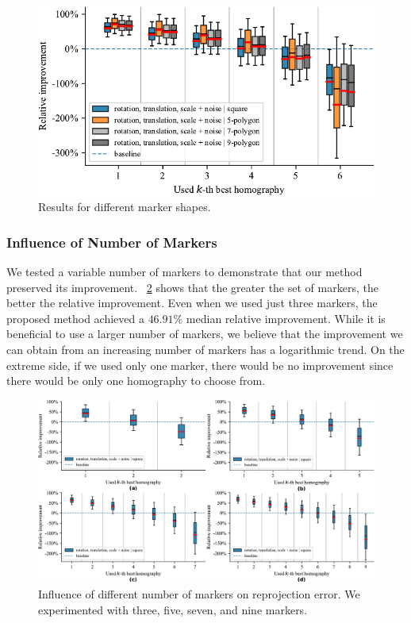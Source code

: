 \begin{figure}[t]
    \centering
    \includegraphics[width=\boxplotimgwidth]{figures/homography/shape_influence.pdf}
    \caption[Influence of marker shape]{Results for different marker shapes.}
    \label{fig:ShapeInfluence}
\end{figure}

\subsubsection{Influence of Number of Markers}

We tested a variable number of markers to demonstrate that our method preserved its improvement. \figtext{}~\ref{fig:NMarkersInfluence} shows that the greater the set of markers, the better the relative improvement. Even when we used just three markers, the proposed method achieved a $46.91$\% median relative improvement. While it is beneficial to use a larger number of markers, we believe that the improvement we can obtain from an increasing number of markers has a logarithmic trend. On the extreme side, if we used only one marker, there would be no improvement since there would be only one homography to choose from.

\begin{figure}[t]
    \centering
    \includegraphics[width=\linewidth]{figures/homography/n_markers_influence.pdf}
    \caption[Influence of number of markers]{Influence of different number of markers on reprojection error. We experimented with  three,  five,  seven, and  nine markers.}
    \label{fig:NMarkersInfluence}
\end{figure}

